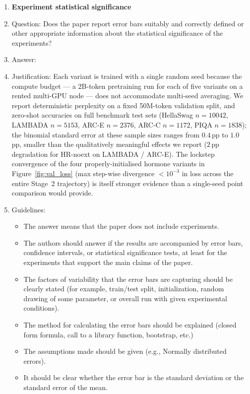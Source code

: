 \begin{enumerate}
\item {\bf Experiment statistical significance}
    \item[] Question: Does the paper report error bars suitably and correctly defined or other appropriate information about the statistical significance of the experiments?
    \item[] Answer: \answerNo{}
    \item[] Justification: Each variant is trained with a single random seed because the compute budget --- a 2B-token pretraining run for each of five variants on a rented multi-GPU node --- does not accommodate multi-seed averaging. We report deterministic perplexity on a fixed 50M-token validation split, and zero-shot accuracies on full benchmark test sets (HellaSwag $n{=}10042$, LAMBADA $n{=}5153$, ARC-E $n{=}2376$, ARC-C $n{=}1172$, PIQA $n{=}1838$); the binomial standard error at these sample sizes ranges from $0.4$\,pp to $1.0$\,pp, smaller than the qualitatively meaningful effects we report ($2$\,pp degradation for HR-noext on LAMBADA / ARC-E). The lockstep convergence of the four properly-initialised hormone variants in Figure~\ref{fig:val_loss} (max step-wise divergence $<10^{-3}$ in loss across the entire Stage~2 trajectory) is itself stronger evidence than a single-seed point comparison would provide.
    \item[] Guidelines:
    \begin{itemize}
        \item The answer \answerNA{} means that the paper does not include experiments.
        \item The authors should answer \answerYes{} if the results are accompanied by error bars, confidence intervals, or statistical significance tests, at least for the experiments that support the main claims of the paper.
        \item The factors of variability that the error bars are capturing should be clearly stated (for example, train/test split, initialization, random drawing of some parameter, or overall run with given experimental conditions).
        \item The method for calculating the error bars should be explained (closed form formula, call to a library function, bootstrap, etc.)
        \item The assumptions made should be given (e.g., Normally distributed errors).
        \item It should be clear whether the error bar is the standard deviation or the standard error of the mean.

\end{itemize}
\end{enumerate}
